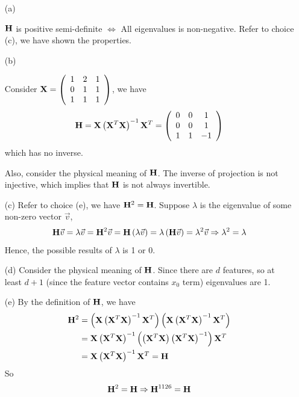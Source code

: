 \documentclass[12pt]{article}
\newcommand{\ParTh}[1]{\left(#1\right)}
\newcommand{\BF}[1]{{\bf#1}}
\newcommand{\Matrix}[2]{\ParTh{\begin{array}{#1}#2\end{array}}}
\begin{document}
\begin{enumerate}
	\item[(a)]

	$\BF{H}$ is positive semi-definite $\Leftrightarrow$ All eigenvalues is non-negative. Refer to choice (c), we have shown the properties.
	\item[(b)]

	Consider $\BF{X}=\Matrix{ccc}{1&2&1\\0&1&1\\1&1&1}$, we have
	\begin{align}
	\BF{H}=\BF{X}\ParTh{\BF{X}^T\BF{X}}^{-1}\BF{X}^T=\Matrix{ccc}{0&0&1\\0&0&1\\1&1&-1}
	\end{align}
	which has no inverse.
	
	Also, consider the physical meaning of $\BF{H}$. The inverse of projection is not injective, which implies that $\BF{H}$ is not always invertible.
	\item[(c)] Refer to choice (e), we have $\BF{H}^2=\BF{H}$. Suppose $\lambda$ is the eigenvalue of some non-zero vector $\vec{v}$,
	\begin{align}
	\BF{H}\vec{v}=\lambda\vec{v}=\BF{H}^2\vec{v}=\BF{H}\ParTh{\lambda\vec{v}}=\lambda\ParTh{\BF{H}\vec{v}}=\lambda^2\vec{v}\Rightarrow\lambda^2=\lambda
	\end{align}
	Hence, the possible results of $\lambda$ is 1 or 0.
	\item[(d)] Consider the physical meaning of $\BF{H}$. Since there are $d$ features, so at least $d+1$ (since the feature vector contains $x_0$ term) eigenvalues are 1.
	\item[(e)] By the definition of $\BF{H}$, we have
	\begin{align}
	\BF{H}^2&=\ParTh{\BF{X}\ParTh{\BF{X}^T\BF{X}}^{-1}\BF{X}^T}\ParTh{\BF{X}\ParTh{\BF{X}^T\BF{X}}^{-1}\BF{X}^T}\\
	&=\BF{X}\ParTh{\BF{X}^T\BF{X}}^{-1}\ParTh{\ParTh{\BF{X}^T\BF{X}}\ParTh{\BF{X}^T\BF{X}}^{-1}}\BF{X}^T\\
	&=\BF{X}\ParTh{\BF{X}^T\BF{X}}^{-1}\BF{X}^T=\BF{H}
	\end{align}
	So
	\begin{align}
	\BF{H}^2=\BF{H}\Rightarrow \BF{H}^{1126}=\BF{H}
	\end{align}
\end{enumerate}
\end{document}
